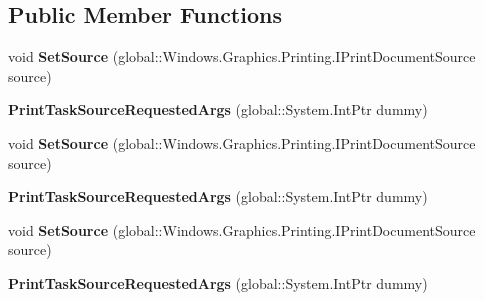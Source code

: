 \subsection*{Public Member Functions}
\begin{DoxyCompactItemize}
\item 
\mbox{\label{class_windows_1_1_graphics_1_1_printing_1_1_print_task_source_requested_args_a39d48374b2d0a2be332c4bf408f2aa57}} 
void {\bfseries Set\+Source} (global\+::\+Windows.\+Graphics.\+Printing.\+I\+Print\+Document\+Source source)
\item 
\mbox{\label{class_windows_1_1_graphics_1_1_printing_1_1_print_task_source_requested_args_a3871e33358823f2a5dd03986bc74c18b}} 
{\bfseries Print\+Task\+Source\+Requested\+Args} (global\+::\+System.\+Int\+Ptr dummy)
\item 
\mbox{\label{class_windows_1_1_graphics_1_1_printing_1_1_print_task_source_requested_args_a39d48374b2d0a2be332c4bf408f2aa57}} 
void {\bfseries Set\+Source} (global\+::\+Windows.\+Graphics.\+Printing.\+I\+Print\+Document\+Source source)
\item 
\mbox{\label{class_windows_1_1_graphics_1_1_printing_1_1_print_task_source_requested_args_a3871e33358823f2a5dd03986bc74c18b}} 
{\bfseries Print\+Task\+Source\+Requested\+Args} (global\+::\+System.\+Int\+Ptr dummy)
\item 
\mbox{\label{class_windows_1_1_graphics_1_1_printing_1_1_print_task_source_requested_args_a39d48374b2d0a2be332c4bf408f2aa57}} 
void {\bfseries Set\+Source} (global\+::\+Windows.\+Graphics.\+Printing.\+I\+Print\+Document\+Source source)
\item 
\mbox{\label{class_windows_1_1_graphics_1_1_printing_1_1_print_task_source_requested_args_a3871e33358823f2a5dd03986bc74c18b}} 
{\bfseries Print\+Task\+Source\+Requested\+Args} (global\+::\+System.\+Int\+Ptr dummy)

\end{DoxyCompactItemize}

